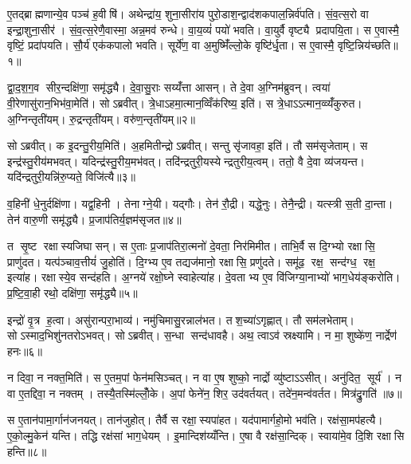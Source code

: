 
\clearpage
{}
\setcounter{anuvakam}{0}
ए॒तद्ब्राह्मणान्ये॒व पञ्च॑ ह॒वीषि॑। अथेन्द्रा॑य॒ शुना॒सीरा॑य पुरो॒डाश॒न्द्वाद॑शकपाल॒न्निर्व॑पति। सं॒व॒त्स॒रो वा इन्द्रा॒शुना॒सीर॑। सं॒व॒त्स॒रेणै॒वास्मा॒ अन्न॒मव॑ रुन्धे। वा॒य॒व्यं॑ पयो॑ भवति। वा॒युर्वै वृष्ट्यै प्रदापयि॒ता। स ए॒वास्मै॒ वृष्टिं॒ प्रदा॑पयति। सौ॒र्य॑ एक॑कपालो भवति। सूर्ये॑ण॒ वा अ॒मुष्मिँ॑ल्लो॒के वृष्टि॑र्धृ॒ता। स ए॒वास्मै॒ वृष्टि॒न्निय॑च्छति॥१॥

द्वा॒द॒श॒ग॒व सीर॒न्दक्षि॑णा॒ समृ॑द्ध्यै। दे॒वा॒सु॒राः सय्यँ॑त्ता आसन्। ते दे॒वा अ॒ग्निम॑ब्रुवन्। त्वया॑ वी॒रेणासु॑रान॒भिभ॑वा॒मेति॑। सोऽब्रवीत्। त्रे॒धाऽहमा॒त्मान॒व्विँक॑रिष्य॒ इति॑। स त्रे॒धाऽऽत्मान॒व्व्यँ॑कुरुत। अ॒ग्निन्तृती॑यम्। रु॒द्रन्तृती॑यम्। वरु॑ण॒न्तृती॑यम्॥२॥

सोऽब्रवीत्। क इ॒दन्तु॒रीय॒मिति॑। अ॒हमितीन्द्रोऽब्रवीत्। सन्तु सृ॑जावहा॒ इति॑। तौ सम॑सृजेताम्। स इन्द्र॑स्तु॒रीय॑मभवत्। यदिन्द्र॑स्तु॒रीय॒मभ॑वत्। तदि॑न्द्रतुरी॒यस्येन्द्रतुरीय॒त्वम्। ततो॒ वै दे॒वा व्य॑जयन्त। यदि॑न्द्रतुरी॒यन्नि॑रु॒प्यते॒ विजि॑त्यै॥३॥

व॒हिनी॑ धे॒नुर्दक्षि॑णा। यद्व॒हिनी। तेनाग्ने॒यी। यद्गौः। तेन॑ रौ॒द्री। यद्धे॒नुः। तेनै॒न्द्री। यत्स्त्री स॒ती दा॒न्ता। तेन॑ वारु॒णी समृ॑द्ध्यै। प्र॒जाप॑तिर्य॒ज्ञम॑सृजत॥४॥

त सृ॒ष्ट रक्षास्यजिघासन्। स ए॒ताः प्र॒जाप॑तिरा॒त्मनो॑ दे॒वता॒ निर॑मिमीत। ताभि॒र्वै स दि॒ग्भ्यो रक्षासि॒ प्राणु॑दत। यत्प॑ञ्चाव॒त्तीयं॑ जु॒होति॑। दि॒ग्भ्य ए॒व तद्यज॑मानो॒ रक्षासि॒ प्रणु॑दते। समू॑ढ॒ रक्ष॒ सन्द॑ग्ध॒ रक्ष॒ इत्या॑ह। रक्षास्ये॒व सन्द॑हति। अ॒ग्नये॑ रक्षो॒घ्ने स्वाहेत्या॑ह। दे॒वताभ्य ए॒व वि॑जिग्या॒नाभ्यो॑ भाग॒धेय॑ङ्करोति। प्र॒ष्टि॒वा॒ही रथो॒ दक्षि॑णा॒ समृ॑द्ध्यै॥५॥

इन्द्रो॑ वृ॒त्र ह॒त्वा। असु॑रान्परा॒भाव्य॑। नमु॑चिमासु॒रन्नाल॑भत। तश॒च्या॑ऽगृह्णात्। तौ सम॑लभेताम्। सोऽस्माद॒भिशु॑नतरोऽभवत्। सोऽब्रवीत्। स॒न्धा सन्द॑धावहै। अथ॒ त्वाऽव॑ स्रक्ष्यामि। न मा॒ शुष्के॑ण॒ नार्द्रेण॑ हनः॥६॥

न दिवा॒ न नक्त॒मिति॑। स ए॒तम॒पां फेन॑मसिञ्चत्। न वा ए॒ष शुष्को॒ नार्द्रो व्यु॑ष्टाऽऽसीत्। अनु॑दित॒ सूर्य॑। न वा ए॒तद्दिवा॒ न नक्तम्। तस्यै॒तस्मि॑ल्लोँ॒के। अ॒पां फेने॑न॒ शिर॒ उद॑वर्तयत्। तदे॑न॒मन्व॑वर्तत। मित्र॑द्रु॒गति॑ ॥७॥

स ए॒तान॑पामा॒र्गान॑जनयत्। तान॑जुहोत्। तैर्वै स रक्षा॒स्यपा॑हत। यद॑पामार्गहो॒मो भव॑ति। रक्ष॑सा॒मप॑हत्यै। ए॒को॒ल्मु॒केन॑ यन्ति। तद्धि रक्ष॑सां भाग॒धेयम्। इ॒मान्दिश॑य्यँन्ति। ए॒षा वै रक्ष॑सा॒न्दिक्। स्वाया॑मे॒व दि॒शि रक्षासि हन्ति॥८॥

